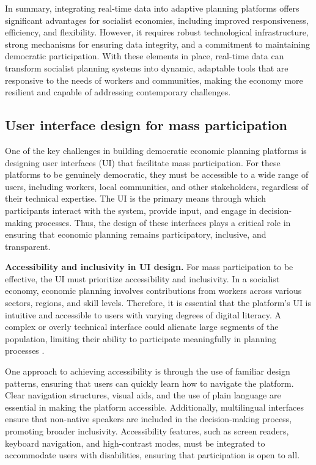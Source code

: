 \begin{refsection}
\medskip

In summary, integrating real-time data into adaptive planning platforms offers significant advantages for socialist economies, including improved responsiveness, efficiency, and flexibility. However, it requires robust technological infrastructure, strong mechanisms for ensuring data integrity, and a commitment to maintaining democratic participation. With these elements in place, real-time data can transform socialist planning systems into dynamic, adaptable tools that are responsive to the needs of workers and communities, making the economy more resilient and capable of addressing contemporary challenges.

\subsection{User interface design for mass participation}

One of the key challenges in building democratic economic planning platforms is designing user interfaces (UI) that facilitate mass participation. For these platforms to be genuinely democratic, they must be accessible to a wide range of users, including workers, local communities, and other stakeholders, regardless of their technical expertise. The UI is the primary means through which participants interact with the system, provide input, and engage in decision-making processes. Thus, the design of these interfaces plays a critical role in ensuring that economic planning remains participatory, inclusive, and transparent.

\textbf{Accessibility and inclusivity in UI design.} For mass participation to be effective, the UI must prioritize accessibility and inclusivity. In a socialist economy, economic planning involves contributions from workers across various sectors, regions, and skill levels. Therefore, it is essential that the platform’s UI is intuitive and accessible to users with varying degrees of digital literacy. A complex or overly technical interface could alienate large segments of the population, limiting their ability to participate meaningfully in planning processes \cite[pp.~45]{shneiderman2013designing}.

One approach to achieving accessibility is through the use of familiar design patterns, ensuring that users can quickly learn how to navigate the platform. Clear navigation structures, visual aids, and the use of plain language are essential in making the platform accessible. Additionally, multilingual interfaces ensure that non-native speakers are included in the decision-making process, promoting broader inclusivity. Accessibility features, such as screen readers, keyboard navigation, and high-contrast modes, must be integrated to accommodate users with disabilities, ensuring that participation is open to all.


\end{refsection}
